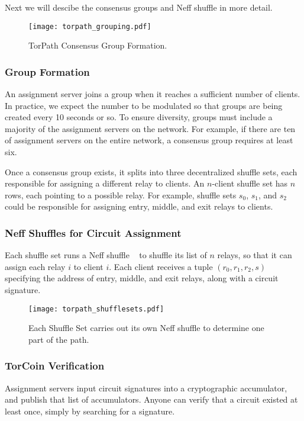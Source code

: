 Next we will descibe the consensus groups and Neff shuffle in more detail.

\begin{figure}[H]
  \centering
    \texttt{[image: torpath\_grouping.pdf]}
  \caption{TorPath Consensus Group Formation.}
\end{figure}

\subsubsection{Group Formation}
An assignment server joins a group when it reaches a sufficient number of clients. In practice, we expect the number to be modulated so that groups are being created every 10 seconds or so. To ensure diversity, groups must include a majority of the assignment servers on the network. For example, if there are ten of assignment servers on the entire network, a consensus group requires at least six.

Once a consensus group exists, it splits into three decentralized shuffle sets, each responsible for assigning a different relay to clients. An $n$-client shuffle set has $n$ rows, each pointing to a possible relay. For example, shuffle sets $s_0$, $s_1$, and $s_2$ could be responsible for assigning entry, middle, and exit relays to clients. 

\subsubsection{Neff Shuffles for Circuit Assignment}
Each shuffle set runs a Neff shuffle ~\cite{neff2001verifiable} to shuffle its list of $n$ relays, so that it can assign each relay $i$ to client $i$. Each client receives a tuple $(r_0, r_1, r_2, s)$ specifying the address of entry, middle, and exit relays, along with a circuit signature.

\begin{figure}
  \centering
    \texttt{[image: torpath\_shufflesets.pdf]}
  \caption{Each Shuffle Set carries out its own Neff shuffle to determine one part of the path.}
\end{figure}

\subsubsection{TorCoin Verification}
Assignment servers input circuit signatures into a cryptographic accumulator, and publish that list of accumulators. Anyone can verify that a circuit existed at least once, simply by searching for a signature.

